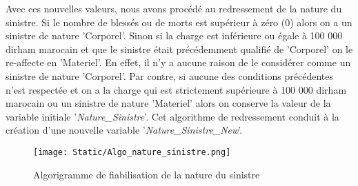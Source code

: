 Avec ces nouvelles valeurs, nous avons proc\'ed\'e au redressement de la nature du sinistre. Si le nombre de bless\'es ou de morts est sup\'erieur \`a z\'ero (0) alors on a un sinistre de nature 'Corporel'. Sinon si la charge est inf\'erieure ou \'egale \`a 100 000 dirham marocain et que le sinistre \'etait pr\'ec\'edemment qualifi\'e de 'Corporel' on le re-affecte en 'Materiel'. En effet, il n'y a aucune raison de le considérer comme un sinistre de nature 'Corporel'. Par contre, si aucune des conditions pr\'ec\'edentes n'est respect\'ee et on a la charge qui est strictement sup\'erieure \`a 100 000 dirham marocain ou un sinistre de nature 'Materiel' alors on conserve la valeur de la variable initiale '\textit{Nature\_Sinistre}'. Cet algorithme de redressement conduit \`a la cr\'eation d'une nouvelle variable '\textit{Nature\_Sinistre\_New}'.
\begin{figure}[H]
    \begin{center}
      \texttt{[image: Static/Algo\_nature\_sinistre.png]} 
      \end{center}
        \caption{Algorigramme de fiabilisation de la nature du sinistre}  \label{fig:xray}
\end{figure}

